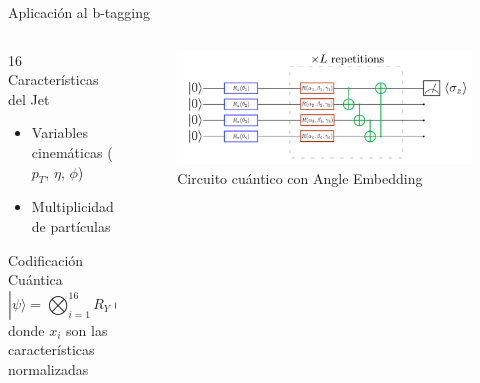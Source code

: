 \documentclass[aspectratio=169]{beamer}
\begin{document}
\begin{frame}{Aplicación al b-tagging}
  \begin{columns}
    \begin{column}{0.45\textwidth}
      \begin{block}{16 Características del Jet}
        \begin{itemize}
          \item Variables cinemáticas (\texorpdfstring{$p_T$}{pT}, \texorpdfstring{$\eta$}{eta}, \texorpdfstring{$\phi$}{phi})
          \item Multiplicidad de partículas
        \end{itemize}
      \end{block}
      \begin{alertblock}{Codificación Cuántica}
        \[ |\psi\rangle = \bigotimes_{i=1}^{16} R_Y(x_i)|0\rangle \]
        donde $x_i$ son las características normalizadas
      \end{alertblock}
    \end{column}
    \begin{column}{0.55\textwidth}
      \begin{figure}
        \includegraphics[width=\textwidth]{angleemb.png}
        \caption{\small Circuito cuántico con Angle Embedding}
      \end{figure}
    \end{column}
  \end{columns}
\end{frame}
\end{document}
